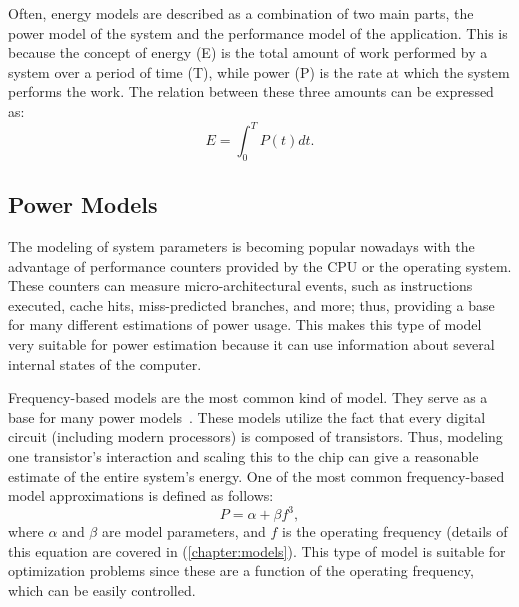 Often, energy models are described as a combination of two main parts, the power model of the system and the performance model of the application. This is because the concept of energy (E) is the total amount of work performed by a system over a period of time (T), while power (P) is the rate at which the system performs the work. The relation between these three amounts can be expressed as:
\begin{equation}
	E = \int_{0}^{T}P(t)dt.
	\label{eq:energy_definition_cont}
\end{equation}

\subsection{Power Models}

The modeling of system parameters is becoming popular nowadays with the advantage of performance counters provided by the CPU or the operating system. These counters can measure micro-architectural events, such as instructions executed, cache hits, miss-predicted branches, and more; thus, providing a base for many different estimations of power usage. This makes this type of model very suitable for power estimation because it can use information about several internal states of the computer.

Frequency-based models are the most common kind of model. They serve as a base for many power models~\cite{Sarwar1997CmosCalculation, Butzen2007LeakageGates, Usman2013ANoC}. These models utilize the fact that every digital circuit (including modern processors) is composed of transistors. Thus, modeling one transistor's interaction and scaling this to the chip can give a reasonable estimate of the entire system's energy. One of the most common frequency-based %
model approximations is defined as follows: 
\begin{equation}
	P = \alpha+\beta f^3,
	\label{eq:power_simplified}
\end{equation}
where $\alpha$ and $\beta$ are model parameters, and $f$ is the operating frequency (details of this equation are covered in (\cref{chapter:models}). This type of model is suitable for optimization problems since these are a function of the operating frequency, which can be easily controlled.



